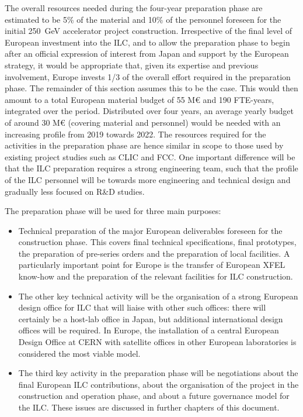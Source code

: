 \documentclass[%
 reprint,
 floatfix,
 amsmath,amssymb,
 aps,
]{revtex4-1}
\begin{document}
The overall resources needed during the four-year preparation phase are estimated to be 5\% of the material and 10\% of the personnel 
foreseen for the initial 250~GeV accelerator project construction. Irrespective of the final level of European investment into the ILC, 
and to allow the preparation phase to begin after an official expression of interest from Japan and support by the European strategy, 
it would be appropriate that, given its expertise and previous involvement, Europe invests 1/3 of the overall effort required in the 
preparation phase. The remainder of this section assumes this to be the case. This would then amount to a total European material 
budget of 55 M\euro{} and 190 FTE-years, integrated over the period.
Distributed over four years, an average yearly budget of around 30 M\euro{} (covering material and personnel) would be needed with an 
increasing profile from 2019 towards 2022. The resources required for the activities in the preparation phase are hence similar in 
scope to those used by existing project studies such as CLIC and FCC. One important difference will be that the ILC preparation 
requires a strong engineering team, such that the profile of the ILC personnel will be towards more engineering and technical 
design and gradually less focused on R\&D studies.

The preparation phase will be used for three main purposes:

\begin{itemize}
\item 
Technical preparation of the major European deliverables foreseen for the construction phase. 
This covers final technical specifications, final prototypes, the preparation of pre-series orders and the preparation of local 
facilities. A particularly important point for Europe is the transfer of European XFEL know-how and the preparation of the 
relevant facilities for ILC construction.
\item
The other key technical activity will be the organisation of a strong European design office for ILC that will liaise with 
other such offices: there will certainly be a host-lab office in Japan, but additional international design offices will be 
required. In Europe, the installation of a central European Design Office at CERN with satellite offices in other European laboratories is considered the most viable model.
\item 
The third key activity in the preparation phase will be negotiations about the final European ILC contributions, about the 
organisation of the project in the construction and operation phase, and about a future governance model for the ILC. These issues are discussed in further chapters of this document.
\end{itemize}
\end{document}

